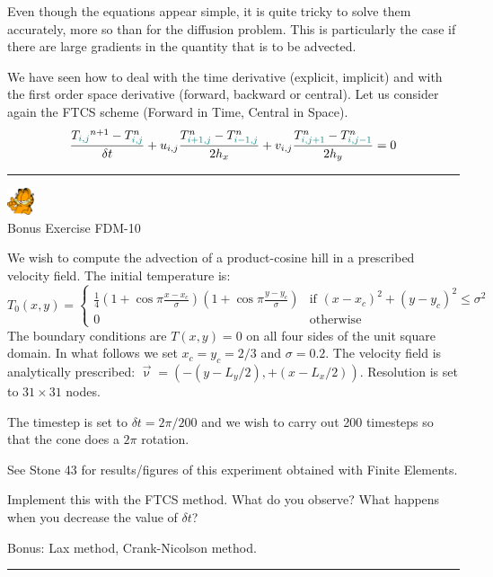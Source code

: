 Even though the equations appear simple, it is quite tricky to solve them accurately, 
more so than for the diffusion problem. 
This is particularly the case if there are large gradients in the quantity that is to be advected. 

We have seen how to deal with the time derivative (explicit, implicit) 
and with the first order space derivative (forward, backward or central).
Let us consider again the FTCS scheme (Forward in Time, Central in Space).
\[
\frac{T_{\color{teal}i,j}^{n+1}-T^n_{\color{teal}i,j}}{\delta t} 
+ u_{i,j} \frac{T^n_{\color{teal}i+1,j} - T^n_{{\color{teal}i-1,j}}}{2h_x} 
+ v_{i,j} \frac{T^n_{\color{teal}i,j+1} - T^n_{{\color{teal}i,j-1}}}{2h_y} =0 
\]


\begin{center}
\begin{minipage}[t]{0.77\textwidth}
\par\noindent\rule{\textwidth}{0.4pt}
\begin{center}
\includegraphics[width=0.8cm]{images/garftr} \\
{\color{orange} Bonus Exercise FDM-10}
\end{center}

We wish to compute the advection of a product-cosine hill
in a prescribed velocity field. The initial temperature is:
\[
T_0(x,y)=
\left\{
\begin{array}{cc}
\frac{1}{4}
\left(1+\cos \pi\frac{x-x_c}{\sigma}\right)
\left(1+\cos \pi\frac{y-y_c}{\sigma}\right)
& \text{if } (x-x_c)^2+(y-y_c)^2\leq \sigma^2 \\
0 & \text{otherwise}
\end{array} 
\right.
\]
The boundary conditions are $T(x,y)=0$ on all four sides of the unit square domain. 
In what follows we set $x_c=y_c=2/3$ and $\sigma=0.2$.  
The velocity field is analytically prescribed: $\vec\upnu=(-(y-L_y/2),+(x-L_x/2))$.
Resolution is set to $31\times31$ nodes.

The timestep is set to $\delta t=2\pi/200$ and we wish to carry out 200
timesteps so that the cone does a $2\pi$ rotation.

See Stone 43 for results/figures of this experiment obtained 
with Finite Elements.

Implement this with the FTCS method. What do you observe? What happens when you decrease 
the value of $\delta t$? 

Bonus: Lax method, Crank-Nicolson method.

\par\noindent\rule{\textwidth}{0.4pt}
\end{minipage}
\end{center}

